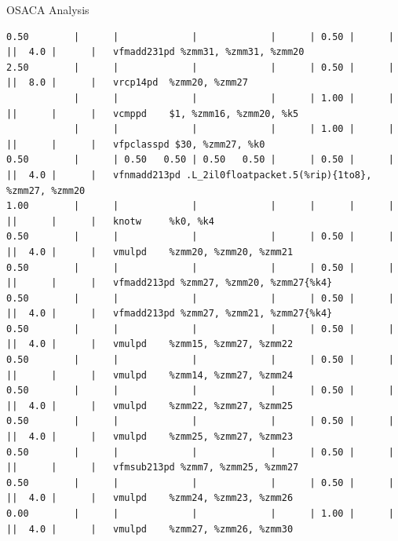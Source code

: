 \documentclass[aspectratio=169,t]{beamer}
\begin{document}
\begin{frame}[fragile]{OSACA Analysis}
\begin{lstlisting}[basicstyle=\tt\fontsize{4pt}{6pt}\selectfont]
0.50        |      |             |             |      | 0.50 |      |      ||  4.0 |      |   vfmadd231pd %zmm31, %zmm31, %zmm20
2.50        |      |             |             |      | 0.50 |      |      ||  8.0 |      |   vrcp14pd  %zmm20, %zmm27
            |      |             |             |      | 1.00 |      |      ||      |      |   vcmppd    $1, %zmm16, %zmm20, %k5
            |      |             |             |      | 1.00 |      |      ||      |      |   vfpclasspd $30, %zmm27, %k0
0.50        |      | 0.50   0.50 | 0.50   0.50 |      | 0.50 |      |      ||  4.0 |      |   vfnmadd213pd .L_2il0floatpacket.5(%rip){1to8}, %zmm27, %zmm20
1.00        |      |             |             |      |      |      |      ||      |      |   knotw     %k0, %k4
0.50        |      |             |             |      | 0.50 |      |      ||  4.0 |      |   vmulpd    %zmm20, %zmm20, %zmm21
0.50        |      |             |             |      | 0.50 |      |      ||      |      |   vfmadd213pd %zmm27, %zmm20, %zmm27{%k4}
0.50        |      |             |             |      | 0.50 |      |      ||  4.0 |      |   vfmadd213pd %zmm27, %zmm21, %zmm27{%k4}
0.50        |      |             |             |      | 0.50 |      |      ||  4.0 |      |   vmulpd    %zmm15, %zmm27, %zmm22
0.50        |      |             |             |      | 0.50 |      |      ||      |      |   vmulpd    %zmm14, %zmm27, %zmm24
0.50        |      |             |             |      | 0.50 |      |      ||  4.0 |      |   vmulpd    %zmm22, %zmm27, %zmm25
0.50        |      |             |             |      | 0.50 |      |      ||  4.0 |      |   vmulpd    %zmm25, %zmm27, %zmm23
0.50        |      |             |             |      | 0.50 |      |      ||      |      |   vfmsub213pd %zmm7, %zmm25, %zmm27
0.50        |      |             |             |      | 0.50 |      |      ||  4.0 |      |   vmulpd    %zmm24, %zmm23, %zmm26
0.00        |      |             |             |      | 1.00 |      |      ||  4.0 |      |   vmulpd    %zmm27, %zmm26, %zmm30
    \end{lstlisting}
  \end{frame}
\end{document}
